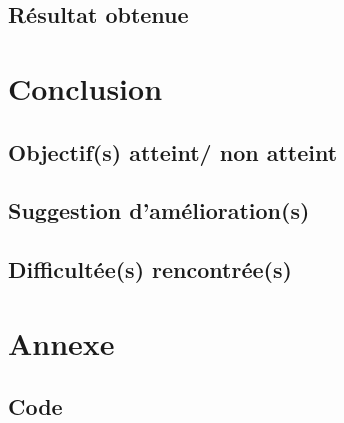 \documentclass[a4paper, 12pt, french]{article}
\begin{document}
	\subsection{Résultat obtenue}

	\section{Conclusion}
	\subsection{Objectif(s) atteint/ non atteint}
	\subsection{Suggestion d'amélioration(s)}
	\subsection{Difficultée(s) rencontrée(s)}

	\section{Annexe}
	\subsection{Code}

	\printbibliography
\end{document}

